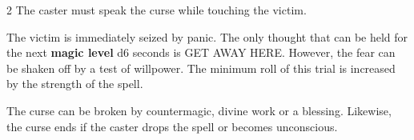 \begin{multicols}{2}
The caster must speak the curse while touching the victim.

The victim is immediately seized by panic. The only thought that can be held for the next \textbf{magic level} d6 seconds is GET AWAY HERE. However, the fear can be shaken off by a test of willpower. The minimum roll of this trial is increased by the strength of the spell.

The curse can be broken by countermagic, divine work or a blessing. Likewise, the curse ends if the caster drops the spell or becomes unconscious.


\end{multicols}